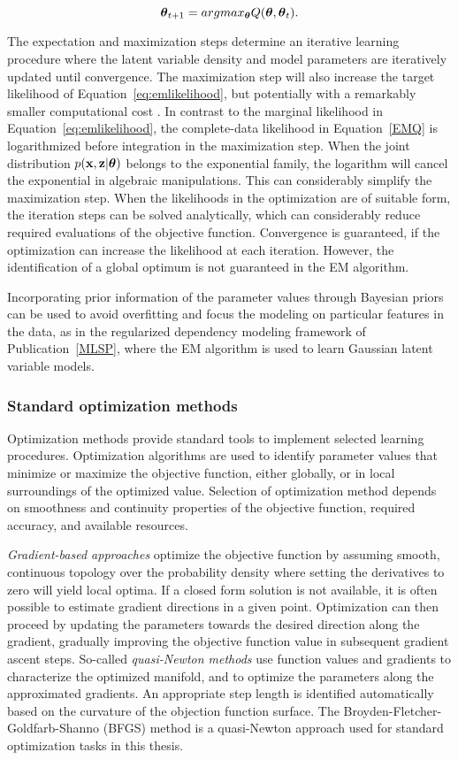 \[ 
   \boldsymbol{\theta}_{t+1} = argmax_{\boldsymbol{\theta}} Q(\boldsymbol{\theta}, \boldsymbol{\theta}_t).
\] 

The expectation and maximization steps determine an iterative learning
procedure where the latent variable density and model parameters are
iteratively updated until convergence.  The maximization step will
also increase the target likelihood of Equation~\ref{eq:emlikelihood},
but potentially with a remarkably smaller computational cost
\citep{Dempster77}.  In contrast to the marginal likelihood in
Equation~\ref{eq:emlikelihood}, the complete-data likelihood in
Equation~\ref{EMQ} is logarithmized before integration in the
maximization step. When the joint distribution \(p(\mathbf{x},\mathbf{z}|\boldsymbol{\theta})\)
belongs to the exponential family, the logarithm will cancel the
exponential in algebraic manipulations. This can considerably simplify
the maximization step. When the likelihoods in the optimization are of
suitable form, the iteration steps can be solved analytically, which
can considerably reduce required evaluations of the objective
function. Convergence is guaranteed, if the optimization can increase
the likelihood at each iteration. However, the identification of a
global optimum is not guaranteed in the EM algorithm.

Incorporating prior information of the parameter values through
Bayesian priors can be used to avoid overfitting and focus the
modeling on particular features in the data, as in the regularized
dependency modeling framework of Publication~\ref{MLSP}, where the EM
algorithm is used to learn Gaussian latent variable models.  

\subsubsection{Standard optimization methods}\label{sec:optim}

Optimization methods provide standard tools to implement selected
learning procedures. Optimization algorithms are used to identify
parameter values that minimize or maximize the objective function,
either globally, or in local surroundings of the optimized
value. Selection of optimization method depends on smoothness and
continuity properties of the objective function, required accuracy,
and available resources.  

{\it Gradient-based approaches} optimize the objective function by
assuming smooth, continuous topology over the probability density
where setting the derivatives to zero will yield local optima. If a
closed form solution is not available, it is often possible to
estimate gradient directions in a given point. Optimization can then
proceed by updating the parameters towards the desired direction along
the gradient, gradually improving the objective function value in
subsequent gradient ascent steps. So-called {\it quasi-Newton methods}
use function values and gradients to characterize the optimized
manifold, and to optimize the parameters along the approximated
gradients. An appropriate step length is identified automatically
based on the curvature of the objection function surface. The
Broyden-Fletcher-Goldfarb-Shanno (BFGS) \citep{Broyden70, Fletcher70,
  Goldfarb70, Shanno70} method is a quasi-Newton approach used for
standard optimization tasks in this thesis.

